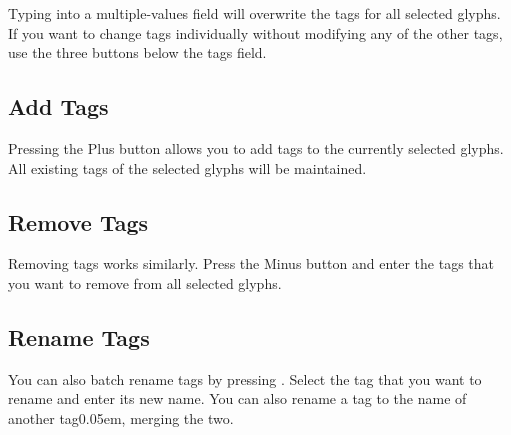 \bigbreak\noindent%

\bigbreak\noindent Typing into a multiple-values field will overwrite the tags for all selected glyphs.
If you want to change tags individually without modifying any of the other tags, use the three buttons below the tags field.

\subsection{Add Tags}%
\label{sub:add_tags}

Pressing the Plus  button allows you to add tags to the currently selected glyphs.
All existing tags of the selected glyphs will be maintained.

\medbreak\noindent%

\subsection{Remove Tags}%
\label{sub:remove_tags}

Removing tags works similarly.
Press the Minus  button and enter the tags that you want to remove from all selected glyphs.

\medbreak\noindent%

\subsection{Rename Tags}%
\label{sub:rename_tags}

You can also batch rename tags by pressing .
Select the tag that you want to rename and enter its new name.
You can also rename a tag to the name of another tag\kern0.05em, merging the two.

\medbreak\noindent%
